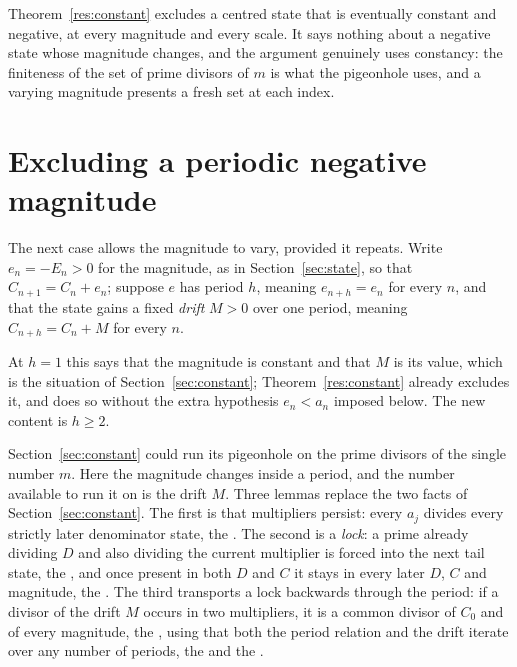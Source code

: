 \documentclass[11pt]{article}
\begin{document}
Theorem~\ref{res:constant} excludes a centred state that is eventually constant
and negative, at every magnitude and every scale.  It says nothing about a
negative state whose magnitude changes, and the argument genuinely uses
constancy: the finiteness of the set of prime divisors of $m$ is what the
pigeonhole uses, and a varying magnitude presents a fresh set at each index.

\section{Excluding a periodic negative magnitude}\label{sec:periodic}

The next case allows the magnitude to vary, provided it repeats.  Write
$e_n=-E_n>0$ for the magnitude, as in Section~\ref{sec:state}, so that
$C_{n+1}=C_n+e_n$; suppose $e$ has period $h$, meaning $e_{n+h}=e_n$ for every
$n$, and that the state gains a fixed \emph{drift} $M>0$ over one period,
meaning $C_{n+h}=C_n+M$ for every $n$.

At $h=1$ this says that the magnitude is constant and that $M$ is its value,
which is the situation of Section~\ref{sec:constant};
Theorem~\ref{res:constant} already excludes it, and does so without the extra
hypothesis $e_n<a_n$ imposed below.  The new content is $h\ge2$.

Section~\ref{sec:constant} could run its pigeonhole on the prime divisors of
the single number $m$.  Here the magnitude changes inside a period, and the
number available to run it on is the drift $M$.  Three lemmas replace the two
facts of Section~\ref{sec:constant}.  The first is
that multipliers persist: every $a_j$ divides every strictly later denominator
state, the
.  The second is a \emph{lock}: a prime already dividing $D$ and also
dividing the current multiplier is forced into the next tail state, the
, and once present in both $D$ and $C$ it stays in every later $D$, $C$
and magnitude, the
.  The third transports a lock backwards through the period: if a
divisor of the drift $M$ occurs in two multipliers, it is a common divisor of
$C_0$ and of every magnitude, the
, using that both the period relation and the drift iterate over any
number of periods, the
 and the
.
\end{document}
